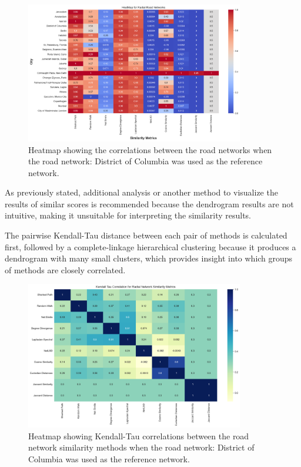 \begin{figure}[!ht]
\centering
\includegraphics[width=0.85\textwidth,center]{picture/Radial/radialheatmap.png}
\caption[Heatmap showing the correlations for Radial Road Networks]{Heatmap showing the correlations between the road networks when the road network: District of Columbia was used as the reference network.}
\label{fig:Heatmap showing the correlations for Radial Road Networks}
\end{figure}

As previously stated, additional analysis or another method to visualize the results of similar scores is recommended because the dendrogram results are not intuitive, making it unsuitable for interpreting the similarity results.

The pairwise Kendall-Tau distance between each pair of methods is calculated first, followed by a complete-linkage hierarchical clustering because it produces a dendrogram with many small clusters, which provides insight into which groups of methods are closely correlated.

\begin{figure}[!ht]
\centering
\includegraphics[width=0.85\textwidth,center]{picture/Radial/radial2.png}
\caption[Heatmap showing Kendall-Tau correlations between the road network similarity methods for Radial Road Networks]{Heatmap showing Kendall-Tau correlations between the road network similarity methods when the road network: District of Columbia was used as the reference network.}
\label{fig:network ranking radial}
\end{figure}

